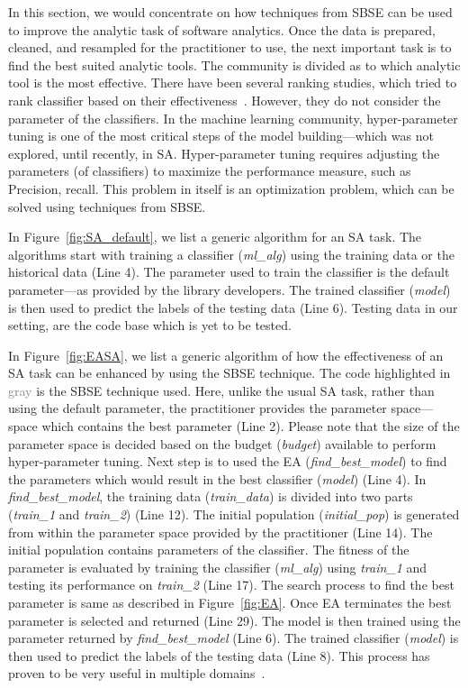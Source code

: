 \documentclass[table, xcdraw, sigconf,review, anonymous]{acmart}
\begin{document}
In this section, we would concentrate on how techniques from SBSE can be used to improve the analytic task of software analytics. Once the data is prepared, cleaned, and resampled for the practitioner to use, the next important task is to find the best suited analytic tools. The community is divided as to which analytic tool is the most effective. There have been several ranking studies, which tried to rank classifier based on their effectiveness~\cite{lessmann2008benchmarking,hall2012systematic,elish2008predicting,menzies2010defect,gondra2008applying}. However, they do not consider the parameter of the classifiers. In the machine learning community, hyper-parameter tuning is one of the most critical steps of the model building---which was not explored, until recently, in SA. Hyper-parameter tuning requires adjusting the parameters (of classifiers) to maximize the performance measure, such as Precision, recall. This problem in itself is an optimization problem, which can be solved using techniques from SBSE. 

In Figure~\ref{fig:SA_default}, we list a generic algorithm for an SA task. The algorithms start with training a classifier (\textit{ml\_alg}) using the training data or the historical data (Line 4). The parameter used to train the classifier is the default parameter---as provided by the library developers. The trained classifier (\textit{model}) is then used to predict the labels of the testing data (Line 6). Testing data in our setting, are the code base which is yet to be tested. 

In Figure~\ref{fig:EASA}, we list a generic algorithm of how the effectiveness of an SA task can be enhanced by using the SBSE technique. The code highlighted in \textcolor{gray}{gray} is the SBSE technique used. Here, unlike the usual SA task, rather than using the default parameter, the practitioner provides the parameter space---space which contains the best parameter (Line 2). Please note that the size of the parameter space is decided based on the budget (\textit{budget}) available to perform hyper-parameter tuning. Next step is to used the EA (\textit{find\_best\_model}) to find the parameters which would result in the best classifier (\textit{model}) (Line 4). In \textit{find\_best\_model}, the training data (\textit{train\_data}) is divided into two parts (\textit{train\_1} and \textit{train\_2}) (Line 12). The initial population (\textit{initial\_pop}) is generated from within the parameter space provided by the practitioner (Line 14). The initial population contains parameters of the classifier. The fitness of the parameter is evaluated by training  the classifier (\textit{ml\_alg}) using \textit{train\_1} and testing its performance on \textit{train\_2} (Line 17). The search process to find the best parameter is same as described in Figure~\ref{fig:EA}. Once EA terminates the best parameter is selected and returned (Line 29). The model is then trained using the parameter returned by \textit{find\_best\_model} (Line 6). The trained classifier (\textit{model}) is then used to predict the labels of the testing data (Line 8). This process has proven to be very useful in multiple domains~\cite{fu2016tuning, fu2016differential, fu2017easy, agrawal2017better, tantithamthavorn2016automated}.
\end{document}
